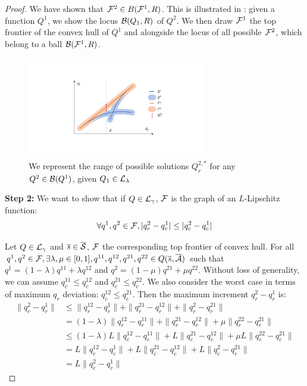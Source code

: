\begin{proof}

We have shown that $\mathcal{F}^2 \in B(\mathcal{F}^1, R)$.
This is illustrated in : given a function $Q^1$, we show the locus $\mathcal{B}(Q_1,R)$ of $Q^2$. We then draw $\mathcal{F}^1$ the top frontier of the convex hull of $Q^1$ and alongside the locus of all possible $\mathcal{F}^2$, which belong to a ball $\mathcal{B}(\mathcal{F}^1, R)$. 

\begin{figure}[ht]
    \centering
    \includegraphics[trim=7cm 4cm 7cm 4cm, clip, width=0.7\textwidth]{source/img/contraction_lipschitz.pdf}
    \caption{We represent the range of possible solutions $Q_r^{2,*}$ for any $Q^2\in\mathcal{B}(Q^1)$, given $Q_1\in\mathcal{L}_\lambda$}
    \label{fig:contraction_lips_hull}
\end{figure}

\textbf{Step 2:} We want to show that if $Q\in\mathcal{L}_\gamma$, $\mathcal{F}$ is the graph of an $L$-Lipschitz function:
\begin{equation}
\label{eq:L-lip-set}
    \forall q^1,q^2\in\mathcal{F}, |q_r^2-q_r^1| \leq |q_c^2-q_c^1|
\end{equation}

Let $Q\in\mathcal{L}_\gamma$ and $\overline{s}\in\overline{\mathcal{S}}$, $\mathcal{F}$ the corresponding top frontier of convex hull.
For all $q^1,q^2\in\mathcal{F}, \exists \lambda,\mu\in[0,1], q^{11},q^{12},q^{21},q^{22}\in Q(\overline{s},\overline{\mathcal{A}})$ such that $q^1 = (1-\lambda)q^{11} + \lambda q^{12}$ and $q^2 = (1-\mu)q^{21} + \mu q^{22}$.
Without loss of generality, we can assume $q_c^{11}\leq q_c^{12}$ and $q_c^{21}\leq q_c^{22}$. We also consider the worst case in terms of maximum $q_r$ deviation: $q_c^{12} \leq q_c^{21}$.
Then the maximum increment $q_r^2-q_r^{1}$ is:
\begin{align*}
    \|q^2_r-q^{1}_r\| &\leq \|q^{12}_r-q^{1}_r\| + \|q^{21}_r-q^{12}_r\| + \|q^{2}_r-q^{21}_r\| \\
    &= (1-\lambda)\|q^{12}_r-q^{11}_r\| + \|q^{21}_r-q^{12}_r\| + \mu\|q^{22}_r-q^{21}_r\| \\ 
    &\leq (1-\lambda)L\|q^{12}_c-q^{11}_c\| + L\|q^{21}_c-q^{12}_c\| + \mu L\|q^{22}_c-q^{21}_c\| \\
    &= L\|q^{12}_c-q^{1}_c\| + L\|q^{21}_c-q^{12}_c\| + L\|q^{2}_c-q^{21}_c\|\\
    &= L\|q^{2}_c-q^{1}_c\|
\end{align*}


\end{proof}
